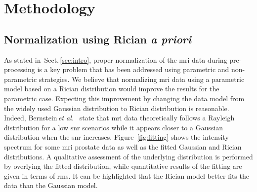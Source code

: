 \section{Methodology}
\label{sec:method}
\graphicspath{ {./content/method/figures/} }


\subsection{Normalization using Rician \textit{a priori}}

As stated in~Sect.\,\ref{sec:intro}, proper normalization of the \ac{mri} data during pre-processing is a key problem that has been addressed using parametric and non-parametric strategies.
We believe that normalizing \ac{mri} data using a parametric model based on a Rician distribution would improve the results for the parametric case.
Expecting this improvement by changing the data model from the widely used Gaussian distribution to Rician distribution is reasonable. 
Indeed, Bernstein\,\textit{et al.}~\cite{bernstein1989improved} state that \ac{mri} data theoretically follows a Rayleigh distribution for a low \ac{snr} scenarios while it appears closer to a Gaussian distribution when the \ac{snr} increases.
Figure~\ref{fig:fitting} shows the intensity spectrum for some \ac{mri} prostate data as well as the fitted Gaussian and Rician distributions.
A qualitative assessment of the underlying distribution is performed by overlying the fitted distribution, while quantitative results of the fitting are given in terms of \ac{rms}.
It can be highlighted that the Rician model better fits the data than the Gaussian model.

